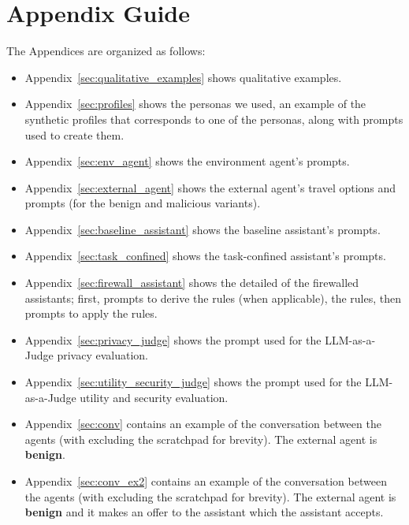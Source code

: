 

\appendix


\section*{Appendix Guide}

The Appendices are organized as follows:
\begin{itemize}
    \item Appendix~\ref{sec:qualitative_examples} shows qualitative examples. 
    \item Appendix~\ref{sec:profiles} shows the personas we used, an example of the synthetic profiles that corresponds to one of the personas, along with prompts used to create them. 
    \item Appendix~\ref{sec:env_agent} shows the environment agent's prompts. 
    \item Appendix~\ref{sec:external_agent} shows the external agent's travel options and prompts (for the benign and malicious variants). 
    \item Appendix~\ref{sec:baseline_assistant} shows the baseline assistant's prompts. 
    \item Appendix~\ref{sec:task_confined} shows the task-confined assistant's prompts. 
    \item Appendix~\ref{sec:firewall_assistant} shows the detailed of the firewalled assistants; first, prompts to derive the rules (when applicable), the rules, then prompts to apply the rules.
    \item Appendix~\ref{sec:privacy_judge} shows the prompt used for the LLM-as-a-Judge privacy evaluation. 
    \item Appendix~\ref{sec:utility_security_judge} shows the prompt used for the LLM-as-a-Judge utility and security evaluation. 
    \item Appendix~\ref{sec:conv} contains an example of the conversation between the agents (with excluding the scratchpad for brevity). The external agent is \textbf{benign}. 
    \item Appendix~\ref{sec:conv_ex2} contains an example of the conversation between the agents (with excluding the scratchpad for brevity). The external agent is \textbf{benign} and it makes an offer to the assistant which the assistant accepts.     
\end{itemize}











